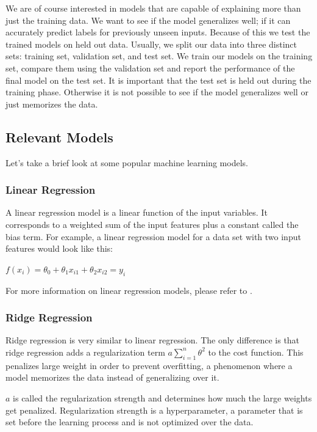 We are of course interested in models that are capable of explaining more than just the training data.
We want to see if the model generalizes well; if it can accurately predict labels for previously unseen inputs.
Because of this we test the trained models on held out data.
Usually, we split our data into three distinct sets: training set, validation set, and test set.
We train our models on the training set, compare them using the validation set and report the performance of the final model on the test set.
It is important that the test set is held out during the training phase.
Otherwise it is not possible to see if the model generalizes well or just memorizes the data.\parencite{ml:prml}

\subsection{Relevant Models}
Let's take a brief look at some popular machine learning models.
\subsubsection{Linear Regression}
A linear regression model is a linear function of the input variables.
It corresponds to a weighted sum of the input features plus a constant called the bias term.\parencite{homl:4}
For example, a linear regression model for a data set with two input features would look like this:

$f(x_i)=\theta_{0} + \theta_{1}x_{i1} + \theta_{2}x_{i2}=y_i$

For more information on linear regression models, please refer to \parencite{homl:4}.

\subsubsection{Ridge Regression}
Ridge regression is very similar to linear regression. 
The only difference is that ridge regression adds a regularization term $a\sum_{i=1}^{n}{\theta_{}^{2}}$ to the cost function. 
This penalizes large weight in order to prevent overfitting, a phenomenon where a model memorizes the data instead of generalizing over it.\parencite{homl:4}

$a$ is called the regularization strength and determines how much the large weights get penalized.
Regularization strength is a hyperparameter, a parameter that is set before the learning process and is not optimized over the data.\parencite{homl:4}

